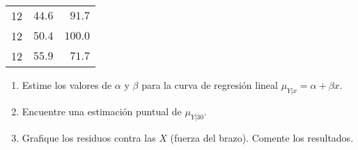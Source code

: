\begin{enunciado}
\begin{center}
\begin{tabular}{c|c|c}
   12 & $44.6$ & $\phantom{1}91.7$ \\
   12 & $50.4$ & $100.0$ \\
   12 & $55.9$ & $\phantom{1}71.7$
  \end{tabular}
 \end{center}
 \begin{enumerate}
  \item Estime los valores de $\alpha$ y $\beta$ para la curva
  de regresi\'on lineal $\mu_{Y|x} = \alpha + \beta x$.
  \item Encuentre una estimaci\'on puntual de $\mu_{Y|30}$.
  \item Grafique los residuos contra las $X$ (fuerza del brazo).
  Comente los resultados.
 \end{enumerate}
\end{enunciado}
